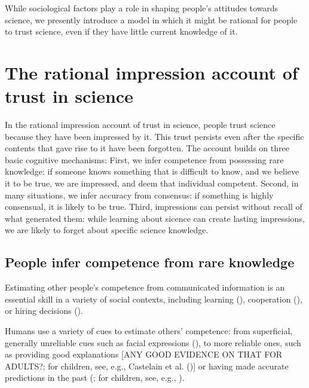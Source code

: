 \documentclass[
  jou,
  floatsintext,
  longtable,
  nolmodern,
  notxfonts,
  notimes,
  colorlinks=true,linkcolor=blue,citecolor=blue,urlcolor=blue]{apa7}
\begin{document}
While sociological factors play a role in shaping people's attitudes
towards science, we presently introduce a model in which it might be
rational for people to trust science, even if they have little current
knowledge of it.

\section{The rational impression account of trust in
science}\label{the-rational-impression-account-of-trust-in-science}

In the rational impression account of trust in science, people trust
science because they have been impressed by it. This trust persists even
after the specific contents that gave rise to it have been forgotten.
The account builds on three basic cognitive mechanisms: First, we infer
competence from possessing rare knowledge: if someone knows something
that is difficult to know, and we believe it to be true, we are
impressed, and deem that individual competent. Second, in many
situations, we infer accuracy from consensus: if something is highly
consensual, it is likely to be true. Third, impressions can persist
without recall of what generated them: while learning about sicence can
create lasting impressions, we are likely to forget about specific
science knowledge.

\subsection{People infer competence from rare
knowledge}\label{people-infer-competence-from-rare-knowledge}

Estimating other people's competence from communicated information is an
essential skill in a variety of social contexts, including learning
(),
cooperation (), or hiring decisions
().

Humans use a variety of cues to estimate others' competence: from
superficial, generally unreliable cues such as facial expressions
(), to more reliable ones, such as providing good explanations
{[}ANY GOOD EVIDENCE ON THAT FOR ADULTS?; for children, see, e.g.,
Castelain et al.
(){]} or having
made accurate predictions in the past
(; for children, see, e.g.,
).
\end{document}
